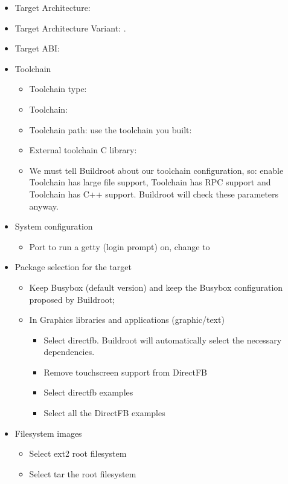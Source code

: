 \begin{itemize}
\item Target Architecture: 
\item Target Architecture Variant: .
\item Target ABI: 
\item Toolchain
  \begin{itemize}
  \item Toolchain type: 
  \item Toolchain: 
  \item Toolchain path: use the toolchain you built:
  \item External toolchain C library: 
  \item We must tell Buildroot about our toolchain configuration, so:
    enable Toolchain has large file support, Toolchain has RPC support
    and Toolchain has C++ support. Buildroot will check these
    parameters anyway.
  \end{itemize}
\item System configuration
  \begin{itemize}
  \item Port to run a getty (login prompt) on, change  to 
  \end{itemize}
\item Package selection for the target
  \begin{itemize}
  \item Keep Busybox (default version) and keep the Busybox
    configuration proposed by Buildroot;
  \item In Graphics libraries and applications (graphic/text)
    \begin{itemize}
    \item Select directfb. Buildroot will automatically select the
      necessary dependencies.
    \item Remove touchscreen support from DirectFB
    \item Select directfb examples
    \item Select all the DirectFB examples
    \end{itemize}
  \end{itemize}
\item Filesystem images
  \begin{itemize}
  \item Select ext2 root filesystem
  \item Select tar the root filesystem
  \end{itemize}
\end{itemize}

